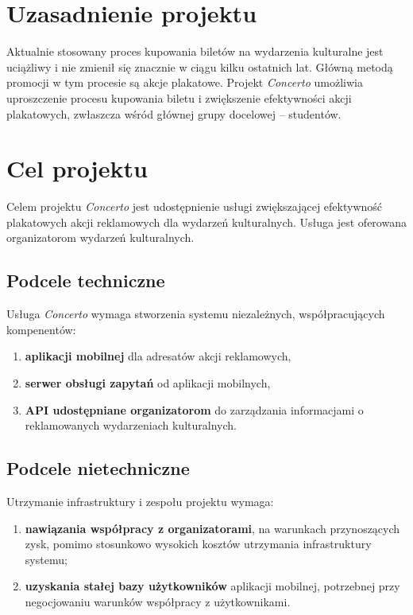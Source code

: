 \documentclass[10pt]{dokument-ppi}
\begin{document}
\MakeDokumentMeta

\section{Uzasadnienie projektu}

Aktualnie stosowany proces kupowania biletów na wydarzenia kulturalne jest
uciążliwy i nie zmienił się znacznie w ciągu kilku ostatnich lat. Główną metodą
promocji w tym procesie są akcje plakatowe. Projekt \emph{Concerto} umożliwia
uproszczenie procesu kupowania biletu i zwiększenie efektywności akcji
plakatowych, zwłaszcza wśród głównej grupy docelowej -- studentów.


\section{Cel projektu}

Celem projektu \emph{Concerto} jest udostępnienie usługi zwiększającej
efektywność plakatowych akcji reklamowych dla wydarzeń kulturalnych. Usługa jest
oferowana organizatorom wydarzeń kulturalnych.

\subsection{Podcele techniczne}

Usługa \emph{Concerto} wymaga stworzenia systemu niezależnych, współpracujących
kompenentów:
\begin{enumerate}
    \item \textbf{aplikacji mobilnej} dla adresatów akcji reklamowych,
    \item \textbf{serwer obsługi zapytań} od aplikacji mobilnych,
    \item \textbf{API udostępniane organizatorom} do zarządzania informacjami o
        reklamowanych wydarzeniach kulturalnych.
\end{enumerate}

\subsection{Podcele nietechniczne}

Utrzymanie infrastruktury i zespołu projektu wymaga:
\begin{enumerate}
    \item \textbf{nawiązania współpracy z organizatorami}, na warunkach
        przynoszących zysk, pomimo stosunkowo wysokich kosztów utrzymania
        infrastruktury systemu;
    \item \textbf{uzyskania stałej bazy użytkowników} aplikacji mobilnej,
        potrzebnej przy negocjowaniu warunków współpracy z użytkownikami.
\end{enumerate}
\end{document}

